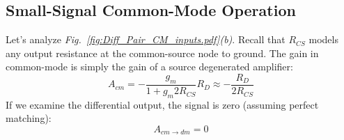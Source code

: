 \subsection{Small-Signal Common-Mode Operation}
Let's analyze \emph{Fig.~\ref{fig:Diff_Pair_CM_inputs.pdf}(b)}.  Recall that $R_{CS}$ models any output resistance at the common-source node to ground.   The gain in common-mode is simply the gain of a source degenerated amplifier:
    \begin{equation}
        A_{cm} = -\frac{g_m}{1 + g_m 2R_{CS}} R_D \approx -\frac{R_D}{2R_{CS}}
    \end{equation}
If we examine the differential output, the signal is zero (assuming perfect matching):
    \begin{equation}
        A_{cm \to dm} = 0
    \end{equation}
